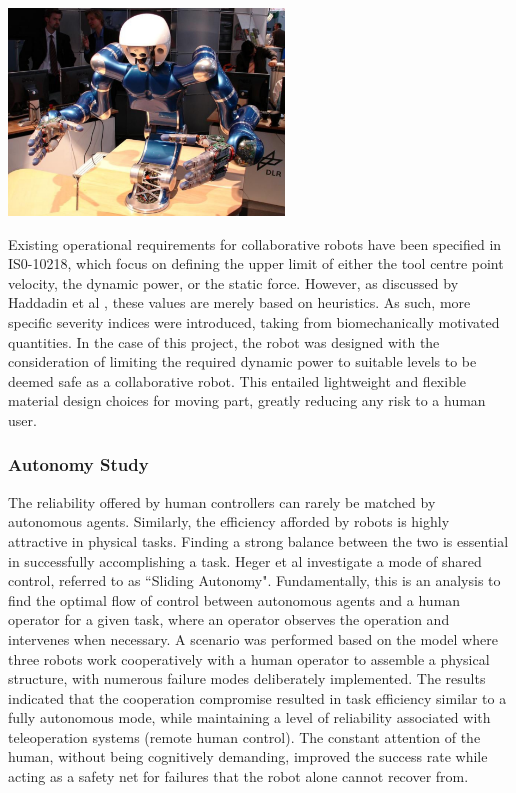 \documentclass[11pt]{article}
\begin{document}
\begin{center}
\includegraphics[width=0.55\textwidth]{humanoid.png}
\label{figure:humanoid}
\end{center}

Existing operational requirements for collaborative robots have been specified in IS0-10218, which focus on defining the upper limit of either the tool centre point velocity, the dynamic power, or the static force. However, as discussed by Haddadin et al \cite{Haddadin2007}, these values are merely based on heuristics. As such, more specific severity indices were introduced, taking from biomechanically motivated quantities. In the case of this project, the robot was designed with the consideration of limiting the required dynamic power to suitable levels to be deemed safe as a collaborative robot. This entailed lightweight and flexible material design choices for moving part, greatly reducing any risk to a human user.

\subsubsection{Autonomy Study}
The reliability offered by human controllers can rarely be matched by autonomous agents. Similarly, the efficiency afforded by robots is highly attractive in physical tasks. Finding a strong balance between the two is essential in successfully accomplishing a task. Heger et al \cite{heger2006} investigate a mode of shared control, referred to as ``Sliding Autonomy". Fundamentally, this is an analysis to find the optimal flow of control between autonomous agents and a human operator for a given task, where an operator observes the operation and intervenes when necessary. A scenario was performed based on the model where three robots work cooperatively with a human operator to assemble a physical structure, with numerous failure modes deliberately implemented. The results indicated that the cooperation compromise resulted in task efficiency similar to a fully autonomous mode, while maintaining a level of reliability associated with teleoperation systems (remote human control). The constant attention of the human, without being cognitively demanding, improved the success rate while acting as a safety net for failures that the robot alone cannot recover from.
\end{document}
